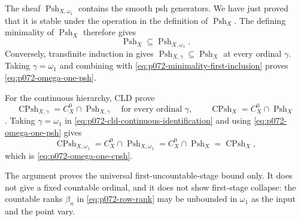 The sheaf \(\operatorname{Psh}_{X,\omega _1}\) contains the smooth psh
generators.  We have just proved that it is stable under the operation in
the definition of \(\operatorname{Psh}_X\).  The defining minimality of
\(\operatorname{Psh}_X\) therefore gives
\begin{equation}
 \label{eq:p072-minimality-first-inclusion}
                 \operatorname{Psh}_X
                 \subseteq\operatorname{Psh}_{X,\omega _1}.
\end{equation}
Conversely, transfinite induction in
\cite[Lemma~8.1.4]{CLD25} gives
\(\operatorname{Psh}_{X,\gamma}\subseteq\operatorname{Psh}_X\) at every
ordinal \(\gamma\).  Taking \(\gamma=\omega _1\) and combining with
\eqref{eq:p072-minimality-first-inclusion} proves
\eqref{eq:p072-omega-one-psh}.

For the continuous hierarchy, CLD prove
\begin{equation}
 \label{eq:p072-cld-continuous-identification}
 \operatorname{CPsh}_{X,\gamma}
 =C_X^0\cap\operatorname{Psh}_{X,\gamma}
 \quad\text{for every ordinal }\gamma,
 \qquad
 \operatorname{CPsh}_X=C_X^0\cap\operatorname{Psh}_X
\end{equation}
\cite[Proposition~8.1.11]{CLD25}.  Taking \(\gamma=\omega _1\) in
\eqref{eq:p072-cld-continuous-identification} and using
\eqref{eq:p072-omega-one-psh} gives
\[
 \operatorname{CPsh}_{X,\omega _1}
 =C_X^0\cap\operatorname{Psh}_{X,\omega _1}
 =C_X^0\cap\operatorname{Psh}_X
 =\operatorname{CPsh}_X,
\]
which is \eqref{eq:p072-omega-one-cpsh}.

The argument proves the universal first-uncountable-stage bound only.  It
does not give a fixed countable ordinal, and it does not show first-stage
collapse: the countable ranks \(\beta_n\) in
\eqref{eq:p072-row-rank} may be unbounded in \(\omega _1\) as the input and
the point vary.
